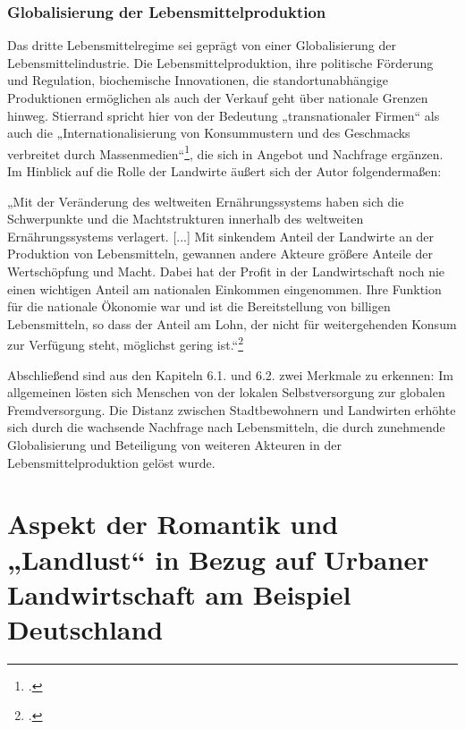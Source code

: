\documentclass{scrartcl}
\begin{document}
\subsubsection*{Globalisierung der Lebensmittelproduktion}
Das dritte Lebensmittelregime sei geprägt von einer Globalisierung der Lebensmittelindustrie. Die Lebensmittelproduktion, ihre politische Förderung und Regulation, biochemische Innovationen, die standortunabhängige Produktionen ermöglichen als auch der Verkauf geht über nationale Grenzen hinweg. Stierrand spricht hier von der Bedeutung „transnationaler Firmen“ als auch die „Internationalisierung von Konsummustern und des Geschmacks verbreitet durch Massenmedien“\footcites[Vgl.][S.24ff]{Stierand2008StadtLebensmittel}, die sich in Angebot und Nachfrage ergänzen. Im Hinblick auf die Rolle der Landwirte äußert sich der Autor folgendermaßen:
\begin{displayquote}
„Mit der Veränderung des weltweiten Ernährungssystems haben sich die Schwerpunkte und die Machtstrukturen innerhalb des weltweiten Ernährungssystems verlagert. [...] Mit sinkendem Anteil der Landwirte an der Produktion von Lebensmitteln, gewannen andere Akteure größere Anteile der Wertschöpfung und Macht. Dabei hat der Profit in der Landwirtschaft noch nie einen wichtigen Anteil am nationalen Einkommen eingenommen. Ihre Funktion für die nationale Ökonomie war und ist die Bereitstellung von billigen Lebensmitteln, so dass der Anteil am Lohn, der nicht für weitergehenden Konsum zur Verfügung steht, möglichst gering ist.“\footcite[S.25]{Stierand2008StadtLebensmittel}
\end{displayquote}

Abschließend sind aus den Kapiteln 6.1. und 6.2. zwei Merkmale zu erkennen: Im allgemeinen lösten sich Menschen von der lokalen Selbstversorgung zur globalen Fremdversorgung. Die Distanz zwischen Stadtbewohnern und Landwirten erhöhte sich durch die wachsende Nachfrage nach Lebensmitteln, die durch zunehmende Globalisierung und Beteiligung von weiteren Akteuren in der Lebensmittelproduktion gelöst wurde. 


\section{Aspekt der Romantik und „Landlust“ in Bezug auf Urbaner Landwirtschaft am Beispiel Deutschland}
\end{document}
